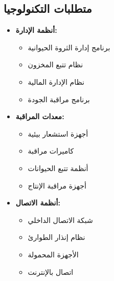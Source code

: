 \subsection{متطلبات التكنولوجيا}
\begin{itemize}
    \item \textbf{أنظمة الإدارة:}
    \begin{itemize}
        \item برنامج إدارة الثروة الحيوانية
        \item نظام تتبع المخزون
        \item نظام الإدارة المالية
        \item برنامج مراقبة الجودة
    \end{itemize}
    
    \item \textbf{معدات المراقبة:}
    \begin{itemize}
        \item أجهزة استشعار بيئية
        \item كاميرات مراقبة
        \item أنظمة تتبع الحيوانات
        \item أجهزة مراقبة الإنتاج
    \end{itemize}
    
    \item \textbf{أنظمة الاتصال:}
    \begin{itemize}
        \item شبكة الاتصال الداخلي
        \item نظام إنذار الطوارئ
        \item الأجهزة المحمولة
        \item اتصال بالإنترنت
    \end{itemize}
\end{itemize}
